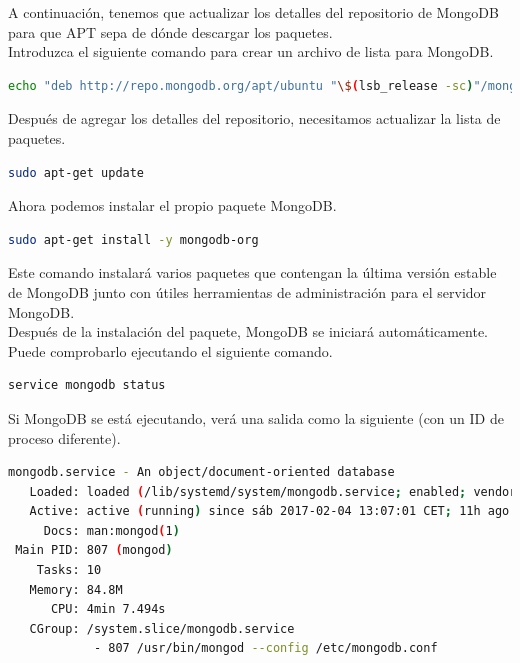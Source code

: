 A continuación, tenemos que actualizar los detalles del repositorio de MongoDB para que APT sepa de dónde descargar los paquetes.\\

Introduzca el siguiente comando para crear un archivo de lista para MongoDB.\\

\begin{lstlisting}[language=bash]
echo "deb http://repo.mongodb.org/apt/ubuntu "\$(lsb_release -sc)"/mongodb-org/3.0 multiverse" | sudo tee /etc/apt/sources.list.d/mongodb-org-3.0.list
\end{lstlisting}

Después de agregar los detalles del repositorio, necesitamos actualizar la lista de paquetes.\\

\begin{lstlisting}[language=bash]
sudo apt-get update
\end{lstlisting}


Ahora podemos instalar el propio paquete MongoDB.\\

\begin{lstlisting}[language=bash]
sudo apt-get install -y mongodb-org
\end{lstlisting}

Este comando instalará varios paquetes que contengan la última versión estable de MongoDB junto con útiles herramientas de administración para el servidor MongoDB.\\

Después de la instalación del paquete, MongoDB se iniciará automáticamente. Puede comprobarlo ejecutando el siguiente comando.\\

\begin{lstlisting}[language=bash]
service mongodb status
\end{lstlisting}

Si MongoDB se está ejecutando, verá una salida como la siguiente (con un ID de proceso diferente).\\

\begin{lstlisting}[language=bash]
 mongodb.service - An object/document-oriented database
   Loaded: loaded (/lib/systemd/system/mongodb.service; enabled; vendor preset: enabled)
   Active: active (running) since sáb 2017-02-04 13:07:01 CET; 11h ago
     Docs: man:mongod(1)
 Main PID: 807 (mongod)
    Tasks: 10
   Memory: 84.8M
      CPU: 4min 7.494s
   CGroup: /system.slice/mongodb.service
            - 807 /usr/bin/mongod --config /etc/mongodb.conf
\end{lstlisting}

